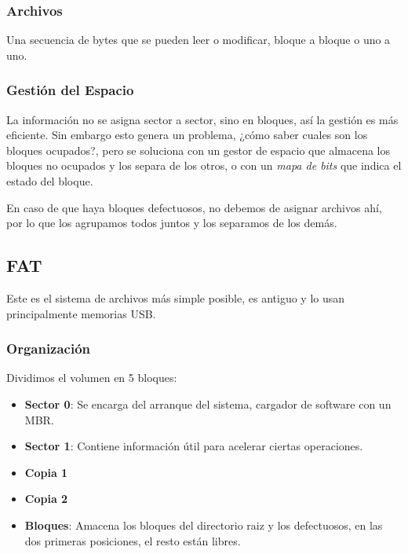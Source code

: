 \subsubsection{Archivos}
\noindent Una secuencia de bytes que se pueden leer o modificar, bloque a bloque o uno a uno.
\subsubsection{Gestión del Espacio}
\noindent La información no se asigna sector a sector, sino en bloques, así la gestión es más eficiente. Sin embargo esto genera un problema, ¿cómo saber cuales son los bloques ocupados?, pero se soluciona con un gestor de espacio que almacena los bloques no ocupados y los separa de los otros, o con un \textit{mapa de bits} que indica el estado del bloque.
\par \noindent En caso de que haya bloques defectuosos, no debemos de asignar archivos ahí, por lo que los agrupamos todos juntos y los separamos de los demás.
\subsection{FAT}
\noindent Este es el sistema de archivos más simple posible, es antiguo y lo usan principalmente memorias USB.
\subsubsection{Organización}
\noindent Dividimos el volumen en 5 bloques:
\begin{itemize}
        \item  \textbf{Sector 0}: Se encarga del arranque del sistema, cargador de software con un MBR.\item  \textbf{Sector 1}: Contiene información útil para acelerar ciertas operaciones.\item  \textbf{Copia 1}\item  \textbf{Copia 2}\item \textbf{Bloques}: Amacena los bloques del directorio raiz y los defectuosos, en las dos primeras posiciones, el resto están libres.
\end{itemize}
